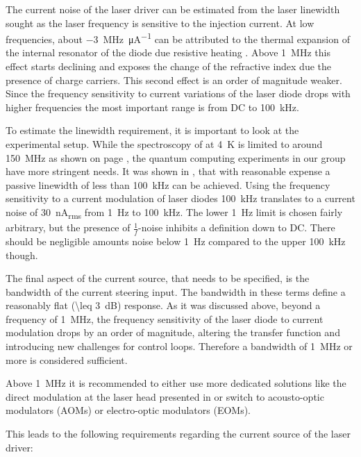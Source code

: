 The current noise of the laser driver can be estimated from the laser linewidth sought as the laser frequency is sensitive to the injection current. At low frequencies, about \qty[per-mode=symbol]{-3}{\MHz \per \micro \A} can be attributed to the thermal expansion of the internal resonator of the diode due resistive heating \cite{diodelaser_modulation}. Above \qty{1}{\MHz} this effect starts declining and exposes the change of the refractive index due the presence of charge carriers. This second effect is an order of magnitude weaker. Since the frequency sensitivity to current variations of the laser diode drops with higher frequencies the most important range is from DC to \qty{100}{\kHz}.

To estimate the linewidth requirement, it is important to look at the experimental setup. While the spectroscopy of  at \qty{4}{\K} is limited to around \qty{150}{\MHz}  as shown on page \pageref{eqn:doppler_broadening}, the quantum computing experiments in our group have more stringent needs. It was shown in \cite{ecdl_stability, ecdl_silicone_housing,ecdl_linewidth_scholten}, that with reasonable expense a passive linewidth of less than \qty{100}{\kHz} can be achieved. Using the frequency sensitivity to a current modulation of laser diodes \qty{100}{\kHz} translates to a current noise of \qty{30}{\nA_{rms}} from \qty{1}{\Hz} to \qty{100}{\kHz}. The lower \qty{1}{\Hz} limit is chosen fairly arbitrary, but the presence of $\frac 1 f$-noise inhibits a definition down to DC. There should be negligible amounts noise below \qty{1}{\Hz} compared to the upper \qty{100}{\kHz} though.

The final aspect of the current source, that needs to be specified, is the bandwidth of the current steering input. The bandwidth in these terms define a reasonably flat (\qty{\leq 3}{\dB}) response. As it was discussed above, beyond a frequency of \qty{1}{\MHz}, the frequency sensitivity of the laser diode to current modulation drops by an order of magnitude, altering the transfer function and introducing new challenges for control loops. Therefore a bandwidth of \qty{1}{\MHz} or more is considered sufficient.

Above \qty{1}{\MHz} it is recommended to either use more dedicated solutions like the direct modulation at the laser head presented in \cite{current_mod_paper} or switch to acousto-optic modulators (AOMs) or electro-optic modulators (EOMs).

This leads to the following requirements regarding the current source of the laser driver:

